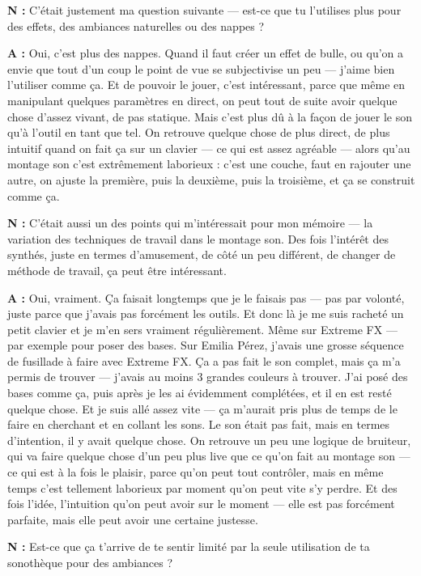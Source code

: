 ﻿\documentclass[12pt]{article}
\begin{document}
\textbf{N :} C'était justement ma question suivante — est-ce que tu l'utilises plus pour des effets, des ambiances naturelles ou des nappes ? 

\textbf{A :} Oui, c'est plus des nappes. Quand il faut créer un effet de bulle, ou qu'on a envie que tout d'un coup le point de vue se subjectivise un peu — j'aime bien l'utiliser comme ça. Et de pouvoir le jouer, c'est intéressant, parce que même en manipulant quelques paramètres en direct, on peut tout de suite avoir quelque chose d'assez vivant, de pas statique. Mais c'est plus dû à la façon de jouer le son qu'à l'outil en tant que tel. On retrouve quelque chose de plus direct, de plus intuitif quand on fait ça sur un clavier — ce qui est assez agréable — alors qu'au montage son c'est extrêmement laborieux : c'est une couche, faut en rajouter une autre, on ajuste la première, puis la deuxième, puis la troisième, et ça se construit comme ça. 

\textbf{N :} C'était aussi un des points qui m'intéressait pour mon mémoire — la variation des techniques de travail dans le montage son. Des fois l'intérêt des synthés, juste en termes d'amusement, de côté un peu différent, de changer de méthode de travail, ça peut être intéressant. 

\textbf{A :} Oui, vraiment. Ça faisait longtemps que je le faisais pas — pas par volonté, juste parce que j'avais pas forcément les outils. Et donc là je me suis racheté un petit clavier et je m'en sers vraiment régulièrement. Même sur Extreme FX — par exemple pour poser des bases. Sur Emilia Pérez, j'avais une grosse séquence de fusillade à faire avec Extreme FX. Ça a pas fait le son complet, mais ça m'a permis de trouver — j'avais au moins 3 grandes couleurs à trouver. J'ai posé des bases comme ça, puis après je les ai évidemment complétées, et il en est resté quelque chose. Et je suis allé assez vite — ça m'aurait pris plus de temps de le faire en cherchant et en collant les sons. Le son était pas fait, mais en termes d'intention, il y avait quelque chose. On retrouve un peu une logique de bruiteur, qui va faire quelque chose d'un peu plus live que ce qu'on fait au montage son — ce qui est à la fois le plaisir, parce qu'on peut tout contrôler, mais en même temps c'est tellement laborieux par moment qu'on peut vite s'y perdre. Et des fois l'idée, l'intuition qu'on peut avoir sur le moment — elle est pas forcément parfaite, mais elle peut avoir une certaine justesse. 

\textbf{N :} Est-ce que ça t'arrive de te sentir limité par la seule utilisation de ta sonothèque pour des ambiances ? 
\end{document}
